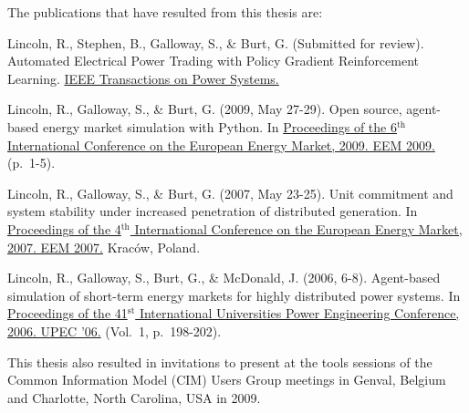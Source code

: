 The publications that have resulted from this thesis are:

\vspace{1pc}
Lincoln, R., Stephen, B., Galloway, S., \& Burt, G. (Submitted for review).
Automated Electrical Power Trading with Policy Gradient Reinforcement Learning.
\ul{IEEE Transactions on Power Systems.}

\vspace{1pc}
Lincoln, R., Galloway, S., \& Burt, G. (2009, May 27-29). Open source,
agent-based energy market simulation with Python. In \ul{Proceedings of
the 6$^{\textrm{th}}$ International Conference on the European Energy Market,
2009. EEM 2009.} (p.~1-5).

\vspace{1pc}
Lincoln, R., Galloway, S., \& Burt, G. (2007, May 23-25). Unit
commitment and system stability under increased penetration of distributed
generation. In \ul{Proceedings of the 4$^{\textrm{th}}$ International Conference
on the European Energy Market, 2007. EEM 2007.} Krac\'ow, Poland.

\vspace{1pc}
Lincoln, R., Galloway, S., Burt, G., \& McDonald, J. (2006, 6-8).
Agent-based simulation of short-term energy markets for highly distributed
power systems. In \ul{Proceedings of the 41$^{\textrm{st}}$ International
Universities Power Engineering Conference, 2006. UPEC '06.} (Vol.~1,
p.~198-202).

\vspace{1pc}
This thesis also resulted in invitations to present at the tools sessions of the
Common Information Model (CIM) Users Group meetings in Genval, Belgium and
Charlotte, North Carolina, USA in 2009.


